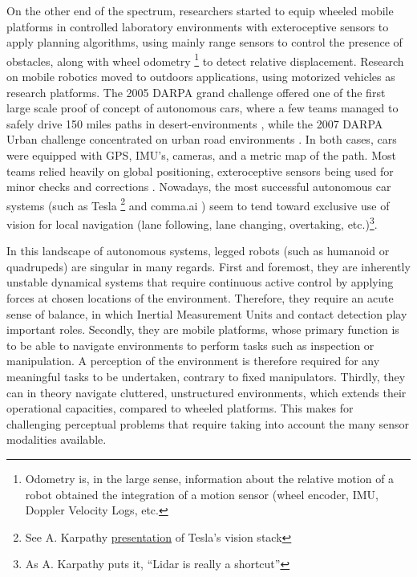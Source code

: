 On the other end of the spectrum, researchers started to equip wheeled mobile platforms in controlled laboratory environments with exteroceptive sensors 
\cite{Nilsson1984ShakeyTR, chatila1985position} to apply planning algorithms, using mainly range sensors to control the presence of obstacles, along with wheel odometry \footnote{Odometry is, in the large sense, information about the relative motion of a robot obtained the integration of a motion sensor (wheel encoder, IMU, Doppler Velocity Logs, etc.}
to detect relative displacement. 
Research on mobile robotics moved to outdoors applications, using motorized vehicles as research platforms. The 2005 DARPA grand challenge
offered one of the first large scale proof of concept of autonomous cars, where a few teams managed to safely drive 150 miles paths in desert-environments 
\cite{thrun2006stanley}, while the 2007 DARPA Urban challenge concentrated on urban road environments \cite{urmson2008autonomous}. In both cases, cars were 
equipped with GPS, IMU's, cameras, and a metric map of the path. Most teams relied heavily on global positioning, exteroceptive sensors being used for 
minor checks and corrections \cite{hillel2014recent}. Nowadays, the most successful autonomous car systems (such as Tesla \footnote{See A. Karpathy  
\href{https://www.youtube.com/watch?v=g6bOwQdCJrc}{presentation} of Tesla's vision stack} and comma.ai \cite{comma2020openpilot}) 
seem to tend toward exclusive use of vision for local navigation (lane following, lane changing, overtaking, etc.)\footnote{As A. Karpathy puts it, “Lidar is really a shortcut”}. 


In this landscape of autonomous systems, legged robots (such as humanoid 
or quadrupeds) are singular in many regards. 
First and foremost, they are inherently unstable dynamical systems that require continuous active control by applying forces at chosen locations of the environment. 
Therefore, they require an acute sense of balance, in which Inertial Measurement Units and contact detection play important roles. 
Secondly, they are mobile platforms, whose primary function is to be able to navigate environments to perform tasks such as inspection or manipulation.
A perception of the environment is therefore required for any meaningful tasks to be undertaken, contrary to fixed manipulators.
Thirdly, they can in theory navigate cluttered, unstructured environments, which extends their operational capacities, compared to wheeled platforms.
This makes for challenging perceptual problems that require taking into account the many sensor modalities available.

